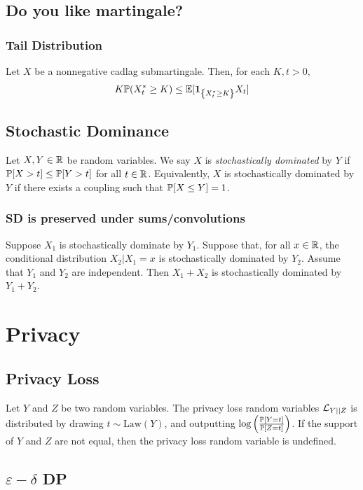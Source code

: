 \documentclass[10pt]{article}
\begin{document}
\subsection{Do you like martingale?}
\subsubsection{Tail Distribution}
Let $X$ be a nonnegative cadlag submartingale. Then, for each $K,t >0$, 
\begin{equation}
   K \mathbb{P} (X_t^* \geq K) \leq \mathop{\mathbb{E} \displaystyle} [ \mathbf{1}_{\left\{ X_t^* \geq K \right\}} X_t] 
\end{equation}
\subsection{Stochastic Dominance} 
 Let $X,Y \in \mathbb{R}$ be random variables. We say $X$ is \emph{stochastically dominated} by $Y$ if $\mathop{\mathbb{P} \displaystyle}[ X >t] \leq \mathop{\mathbb{P} \displaystyle}[Y >t]$ for all $t \in \mathbb{R}$. Equivalently, $X$ is stochastically dominated by $Y$ if there exists a coupling such that $\mathop{\mathbb{P} \displaystyle}[X \leq Y] =1$. 
\subsubsection{SD is preserved under sums/convolutions}
 Suppose $X_1$ is stochastically dominate by $Y_1$. Suppose that, for all $x \in \mathbb{R}$, the conditional distribution $X_2 | X_1=x$ is stochastically dominated by $Y_2$. Assume that $Y_1$ and $Y_2$ are independent. Then $X_1 +X_2$ is stochastically dominated by $Y_1+Y_2$. 
\section{Privacy}
\subsection{Privacy Loss}
 Let $Y$ and $Z$ be two random variables. The privacy loss random variables $\mathcal{L}_{Y || Z}$ is distributed by drawing $t \sim \text{Law}(Y)$, and outputting $\log \left( \frac{\mathbb{P}[Y=t]}{\mathbb{P}[Z=t]}\right)$. If the support of $Y$ and $Z$ are not equal, then the privacy loss random variable is undefined. 
\subsection[alternative]{$\varepsilon-\delta$ DP}
\end{document}
